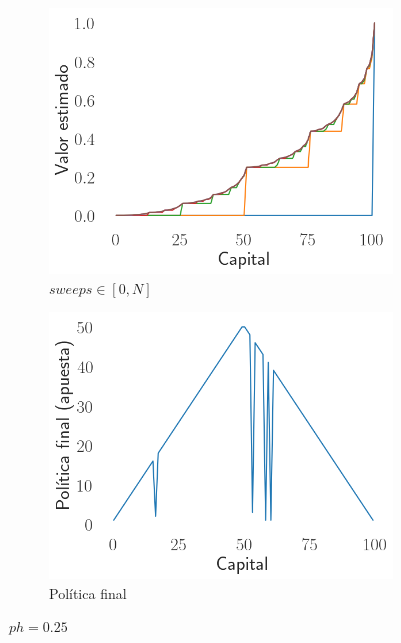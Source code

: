 \begin{figure}[H]
    \centering
    \begin{subfigure}[H]{0.45\textwidth}
        \includegraphics[width=\textwidth]{../img/sweeps_0.25}
        \caption{$sweeps \in [0, N]$}
        \label{fig:ph_025_sweeps}
    \end{subfigure}
    \begin{subfigure}[H]{0.45\textwidth}
        \includegraphics[width=\textwidth]{../img/policy_0.25}
        \caption{Política final}
        \label{fig:ph_025_policy}
    \end{subfigure}
    \caption{$ph=0.25$}
    \label{fig:ph_025_gamblers_problem}
\end{figure}

